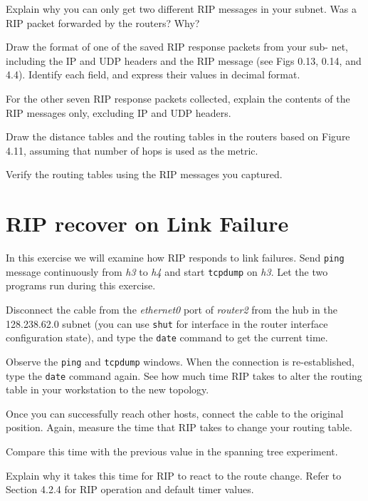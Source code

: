\documentclass{../UTNetLab}
\begin{document}
    \begin{report}
    \item Explain why you can only get two different RIP messages in your subnet.
    Was a RIP packet forwarded by the routers?
    Why?
    
    \item Draw the format of one of the saved RIP response packets from your sub- net, including the IP and UDP headers and the RIP message (see Figs 0.13, 0.14, and 4.4). Identify each field, and express their values in decimal format.
    
    \item For the other seven RIP response packets collected, explain the contents of the RIP messages only, excluding IP and UDP headers.

    
    \item Draw the distance tables and the routing tables in the routers based on Figure 4.11, assuming that number of hops is used as the metric.

    \item Verify the routing tables using the RIP messages you captured.
    \end{report}


\section{RIP recover on Link Failure}
    In this exercise we will examine how RIP responds to link failures.
    Send \lstinline{ping} message continuously from \textit{h3} to \textit{h4} and start \lstinline{tcpdump} on \textit{h3}.
    Let the two programs run during this exercise.

    Disconnect the cable from the \textit{ethernet0} port of \textit{router2} from the hub in the 128.238.62.0 subnet (you can use \lstinline[language={cisco}]{shut} for interface in the router interface configuration state), and type the \lstinline{date} command to get the current time.

    Observe the \lstinline{ping} and \lstinline{tcpdump} windows.
    When the connection is re-established, type the \lstinline{date} command again.
    See how much time RIP takes to alter the routing table in your workstation to the new topology.

    Once you can successfully reach other hosts, connect the cable to the original position.
    Again, measure the time that RIP takes to change your routing table.
    
    \begin{report}
    \item Compare this time with the previous value in the spanning tree experiment.
    
    \item Explain why it takes this time for RIP to react to the route change.
        Refer to Section 4.2.4 for RIP operation and default timer values.
    \end{report}
\end{document}
